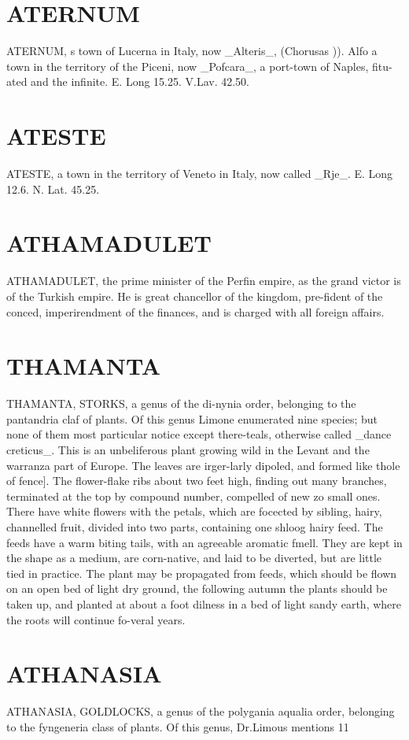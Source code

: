 \documentclass{article}
\begin{document}
\section*{ATERNUM}
ATERNUM, s town of Lucerna in Italy, now \_Alteris\_, (Chorusas )). Alfo a town in the territory of the Piceni, now \_Pofcara\_, a port-town of Naples, fitu-ated and the infinite. E. Long 15.25. V.Lav. 42.50.

\section*{ATESTE}
ATESTE, a town in the territory of Veneto in Italy, now called \_Rje\_. E. Long 12.6. N. Lat. 45.25.

\section*{ATHAMADULET}
ATHAMADULET, the prime minister of the Perfin empire, as the grand victor is of the Turkish empire. He is great chancellor of the kingdom, pre-fident of the conced, imperirendment of the finances, and is charged with all foreign affairs.

\section*{THAMANTA}
THAMANTA, STORKS, a genus of the di-nynia order, belonging to the pantandria claf of plants. Of this genus Limone enumerated nine species; but none of them most particular notice except there-teals, otherwise called \_dance creticus\_. This is an unbeliferous plant growing wild in the Levant and the warranza part of Europe. The leaves are irger-larly dipoled, and formed like thole of fence]. The flower-flake ribs about two feet high, finding out many branches, terminated at the top by compound number, compelled of new zo small ones. There have white flowers with the petals, which are focected by sibling, hairy, channelled fruit, divided into two parts, containing one shloog hairy feed. The feeds have a warm biting tails, with an agreeable aromatic fmell. They are kept in the shape as a medium, are corn-native, and laid to be diverted, but are little tied in practice. The plant may be propagated from feeds, which should be flown on an open bed of light dry ground, the following autumn the plants should be taken up, and planted at about a foot dilness in a bed of light sandy earth, where the roots will continue fo-veral years.

\section*{ATHANASIA}
ATHANASIA, GOLDLOCKS, a genus of the polygania aqualia order, belonging to the fyngeneria class of plants. Of this genus, Dr.Limous mentions 11
\end{document}
